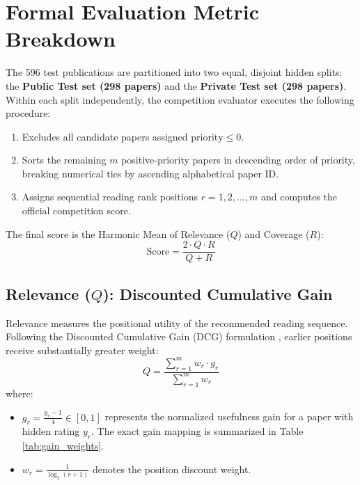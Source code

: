 \section{Formal Evaluation Metric Breakdown}
The 596 test publications are partitioned into two equal, disjoint hidden splits: the \textbf{Public Test set (298 papers)} and the \textbf{Private Test set (298 papers)}. Within each split independently, the competition evaluator executes the following procedure:
\begin{enumerate}
  \item Excludes all candidate papers assigned $\text{priority} \le 0$.
  \item Sorts the remaining $m$ positive-priority papers in descending order of priority, breaking numerical ties by ascending alphabetical paper ID.
  \item Assigns sequential reading rank positions $r = 1, 2, \dots, m$ and computes the official competition score.
\end{enumerate}

The final score is the Harmonic Mean of Relevance ($Q$) and Coverage ($R$):
\begin{equation}
  \text{Score} = \frac{2 \cdot Q \cdot R}{Q + R}
  \label{eq:harmonic_mean}
\end{equation}

\subsection{Relevance ($Q$): Discounted Cumulative Gain}
Relevance measures the positional utility of the recommended reading sequence. Following the Discounted Cumulative Gain (DCG) formulation \cite{jarvelin2002cumulated}, earlier positions receive substantially greater weight:
\begin{equation}
  Q = \frac{\sum_{r=1}^m w_r \cdot g_r}{\sum_{r=1}^m w_r}
  \label{eq:relevance}
\end{equation}
where:
\begin{itemize}
  \item $g_r = \frac{y_r - 1}{4} \in [0, 1]$ represents the normalized usefulness gain for a paper with hidden rating $y_r$. The exact gain mapping is summarized in Table \ref{tab:gain_weights}.
  \item $w_r = \frac{1}{\log_2(r + 1)}$ denotes the position discount weight.
\end{itemize}

